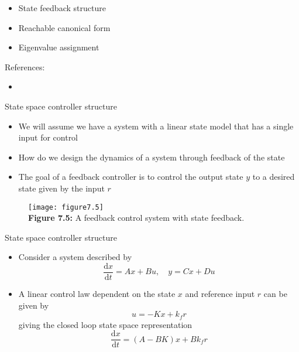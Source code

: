 \documentclass{beamer-control}
\begin{document}

\begin{SUMMARY}
\begin{itemize}
\item State feedback structure
\item Reachable canonical form
\item Eigenvalue assignment
\end{itemize}
\vfill References:
\begin{itemize}
\item {}
\end{itemize}
\end{SUMMARY}




\begin{frame}{State space controller structure}
\begin{itemize}
\item We will assume we have a system with a linear state model that has a single input for control
\item How do we design the dynamics of a system through feedback of the state
\item The goal of a feedback controller is to control the output state $y$ to a desired state given by the input $r$
\end{itemize}
\begin{figure}
	\centering
	\texttt{[image: figure7.5]}
	\\
	\textbf{Figure 7.5:} A feedback control system with state feedback.
\end{figure}
\end{frame}


\begin{frame}{State space controller structure}
	\begin{itemize}
		\item Consider a system described by
		\[ \frac{\mathrm{d} x}{\mathrm{d} t}=A x+B u, \quad y=C x+D u\]
		\item A linear control law dependent on the state $x$ and reference input $r$ can be given by 
		\[u = -Kx + k_f r\] 
		giving the closed loop state space representation 
		\[\frac{\mathrm{d} x}{\mathrm{d} t} = (A-BK)x + Bk_f r \]
	\end{itemize}
\end{frame}
\end{document}
